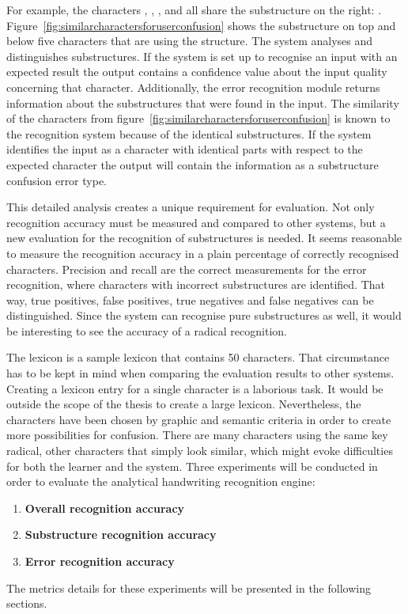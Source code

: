 For example, the characters 
, , ,  and  all share the substructure
on the right: .
Figure~\ref{fig:similarcharactersforuserconfusion} shows the
substructure on top and below five characters that are using the structure.
The system analyses and distinguishes substructures. If the system is set
up to recognise an input with an expected result the output contains
a confidence value about the input quality concerning that character.
Additionally, the error recognition module returns information about the
substructures that were found in the input.
The similarity of the characters from 
figure~\ref{fig:similarcharactersforuserconfusion} is known to
the recognition system because of the identical substructures.
If the system identifies the input as a character with identical parts
with respect to the expected character the output will contain the information
as a substructure confusion error type.

This detailed analysis creates a unique requirement for evaluation. Not only
recognition accuracy must be measured and compared to other systems,
but a new evaluation for the recognition of substructures is needed.
It seems reasonable to measure the recognition accuracy in a plain 
percentage of correctly recognised characters. 
Precision and recall are the correct measurements for the error recognition,
where characters with incorrect substructures are identified. 
That way, true positives, false positives, 
true negatives and false negatives can be distinguished.
Since the system can recognise pure substructures as well, it would 
be interesting to see the accuracy of a radical recognition.

The lexicon is a sample lexicon that contains 50 characters. That circumstance
has to be kept in mind when comparing the evaluation results to other
systems. Creating a lexicon entry for a single character is a laborious task.
It would be outside the scope of the thesis to create a large lexicon.
Nevertheless, the characters have been chosen by graphic and
semantic criteria in order to create more possibilities for confusion.
There are many characters using the same key radical, other characters
that simply look similar, which might evoke difficulties 
for both the learner and the system.
Three experiments will be conducted in order to evaluate the analytical
handwriting recognition engine:
\begin{enumerate}
  \item \textbf{Overall recognition accuracy} \label{eval:enum:overall}
  \item \textbf{Substructure recognition accuracy} \label{eval:enum:substructure}
  \item \textbf{Error recognition accuracy} \label{eval:enum:errorrecognition}
\end{enumerate}
The metrics details for these experiments will be presented in the following 
sections.

